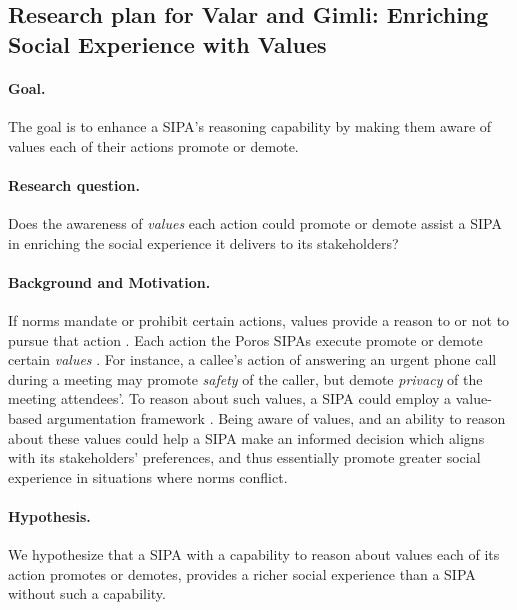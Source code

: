 \documentclass[11pt,          %
               phd,           %
               onehalfspacing %
               ]{ncsuthesis}
\newcommand{\fsl}{\textsl}
\newcommand{\frameworkB}{Poros\xspace}
\newcommand{\frameworkC}{Valar\xspace}
\newcommand{\frameworkD}{Gimli\xspace}
\begin{document}
%
%

\subsection[Enriching Social Experience with Values]{Research plan for \frameworkC and \frameworkD: Enriching Social Experience with Values}

\paragraph*{Goal.} The goal is to enhance a SIPA's reasoning capability
by making them aware of values each of their actions promote or demote.

\paragraph*{Research question.} Does the awareness of \fsl{values} each
action could promote or demote assist a SIPA in enriching the social
experience it delivers to its stakeholders?

\paragraph*{Background and Motivation.} 
If norms mandate or prohibit certain actions, values provide a reason to
or not to pursue that action \citep{Dechesne-AIL13-Norms+Values}. Each
action the \frameworkB SIPAs execute promote or demote certain
\fsl{values} \citep{pasotti-2016-normas}. For instance, a callee's
action of answering an urgent phone call during a meeting may promote
\fsl{safety} of the caller, but demote \fsl{privacy} of the meeting
attendees'. To reason about such values, a SIPA could employ a
value-based argumentation framework \citep{BenchCapon-2003-Persuasion}.
Being aware of values, and an ability to reason about these values could
help a SIPA make an informed decision which aligns with its
stakeholders' preferences, and thus essentially promote greater social
experience in situations where norms conflict.

\paragraph*{Hypothesis.} We hypothesize that a SIPA with a capability to
reason about values each of its action promotes or demotes, provides a
richer social experience than a SIPA without such a capability.
\end{document}
